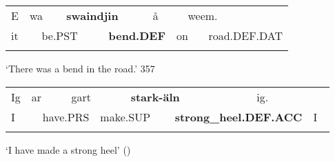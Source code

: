 \begin{tabular}{llllllllll}
\lsptoprule
E & \multicolumn{2}{l}{wa

} & \multicolumn{2}{l}{{\bfseries swaindjin}

} & \multicolumn{2}{l}{å

} & \multicolumn{2}{l}{weem.

} & \\
\multicolumn{2}{l}{it

} & \multicolumn{2}{l}{be.PST

} & \multicolumn{2}{l}{{\bfseries bend.DEF}

} & \multicolumn{2}{l}{on

} & \multicolumn{2}{l}{road.DEF.DAT

}\\
\lspbottomrule
\end{tabular}

\begin{styleTranslation}
‘There was a bend in the road.’ 357

\end{styleTranslation}


\begin{listWWNumileveli}
\item {}

\end{listWWNumileveli}

\begin{tabular}{llllllllll}
\lsptoprule
Ig & \multicolumn{2}{l}{ar

} & \multicolumn{2}{l}{gart

} & \multicolumn{2}{l}{{\bfseries stark-äln}

} & \multicolumn{2}{l}{ig.

} & \\
\multicolumn{2}{l}{I 

} & \multicolumn{2}{l}{have.PRS

} & \multicolumn{2}{l}{make.SUP

} & \multicolumn{2}{l}{{\bfseries strong\_heel.DEF.ACC}

} & \multicolumn{2}{l}{I

}\\
\lspbottomrule
\end{tabular}

\begin{styleTranslation}
‘I have made a strong heel’ (\citet[95]{Levander1909})

\end{styleTranslation}

